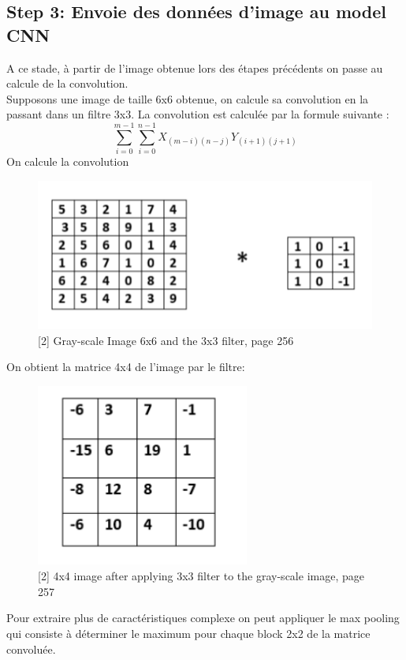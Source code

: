 \documentclass[12pt, letterpaper]{article}
\begin{document}
\subsection{Step 3: Envoie des données d'image au model CNN}
\par A ce stade, à partir de l’image obtenue lors des étapes précédents on passe au calcule de la convolution.\\
Supposons une image de taille 6x6 obtenue, on calcule sa convolution en la passant dans un filtre 3x3. La convolution est calculée par la formule suivante :
$$ \sum_{i=0}^{m-1}\sum_{i=0}^{n-1} X_{(m-i)(n-j)}Y_{(i+1)(j+1)}$$
On calcule la convolution 
\begin{figure}[H]
    \includegraphics[width=\linewidth]{images/convolution.png}
    \caption{[2] Gray-scale Image 6x6 and the 3x3 filter, page 256}
    \label{fig:L1}
\end{figure}
On obtient la matrice 4x4 de l’image par le filtre:
\begin{figure}[H]
    \includegraphics[width=7cm,height=6cm]{images/pooling.png}
    \caption{[2] 4x4 image after applying 3x3 filter to the gray-scale image, page 257}
    \label{fig:L1}
\end{figure}
Pour extraire plus de caractéristiques complexe on peut appliquer le max pooling qui consiste à déterminer le maximum pour chaque block 2x2 de la matrice convoluée.
\end{document}
